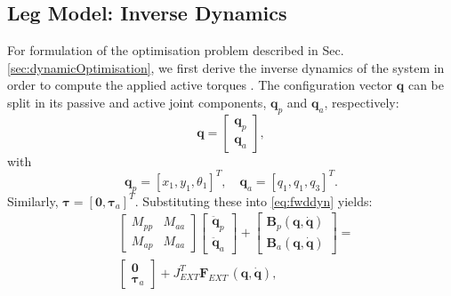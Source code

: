\documentclass[letterpaper, 10 pt, conference]{ieeeconf}  %
\begin{document}


\subsection{Leg Model: Inverse Dynamics}
For formulation of the optimisation problem described in Sec. \ref{sec:dynamicOptimisation}, we first derive the inverse dynamics of the system in order to compute the applied active torques \cite{nakanishi2007inverse}. The configuration vector $\mathbf{q}$ can be split in its passive and active joint components, $\mathbf{q}_p$ and $\mathbf{q}_a$, respectively:
\begin{equation}
\mathbf{q} =
\begin{bmatrix}
	\mathbf{q}_p \\
	\mathbf{q}_a
\end{bmatrix},
\end{equation}
with
\begin{equation}
\mathbf{q}_p = [x_1,y_1,\theta_1]^T, \quad  
\mathbf{q}_a = [q_1,q_1,q_3]^T.
\end{equation}
\noindent
Similarly, $\boldsymbol{\tau} = \left[\mathbf{0},\boldsymbol{\tau}_a\right]^T$.
Substituting these into \eqref{eq:fwddyn} yields:
\begin{equation}
\begin{aligned}
&\left[\begin{array}{cc}  
M_{pp} & M_{aa}\\
M_{ap} & M_{aa}
\end{array} \right]
\left[\begin{array}{c}  
\mathbf{\ddot q}_p\\
\mathbf{\ddot q}_a
\end{array} \right] +
\left[\begin{array}{c}  
\mathbf{B}_p \mathbf{(q,\dot q)}\\
\mathbf{B}_a \mathbf{(q,\dot q)}
\end{array} \right] 
=\\
&\left[\begin{array}{c}  
\mathbf{0}\\
\boldsymbol{\tau}_a
\end{array} \right] 
+
J_{EXT}^T
\mathbf{F}_{EXT} \, \mathbf{(q, \dot q)},
\end{aligned} \label{eq:ik}
\end{equation}		
\end{document}
